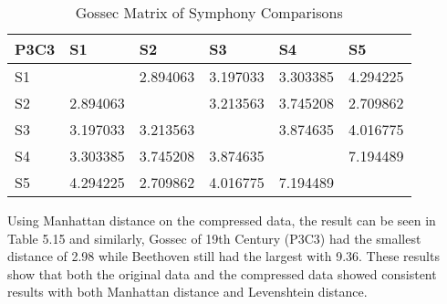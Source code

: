 \begin{longtable}{|l|l|l|l|l|l|}
\caption{Gossec Matrix of Symphony Comparisons}
\label{my-label}\\
\hline
P3C3 & S1 & S2 & S3 & S4 & S5 \\ \hline
\endfirsthead
%
\endhead
%
S1 &  & 2.894063 & 3.197033 & 3.303385 & 4.294225 \\ \hline
S2 & 2.894063 &  & 3.213563 & 3.745208 & 2.709862 \\ \hline
S3 & 3.197033 & 3.213563 &  & 3.874635 & 4.016775 \\ \hline
S4 & 3.303385 & 3.745208 & 3.874635 &  & 7.194489 \\ \hline
S5 & 4.294225 & 2.709862 & 4.016775 & 7.194489 &  \\ \hline
\end{longtable}

Using Manhattan distance on the compressed data, the result can be seen in Table 5.15 and similarly, Gossec of 19th Century (P3C3) had the smallest distance of 2.98 while Beethoven still had the largest with 9.36. These results show that both the original data and the compressed data showed consistent results with both Manhattan distance and Levenshtein distance.

